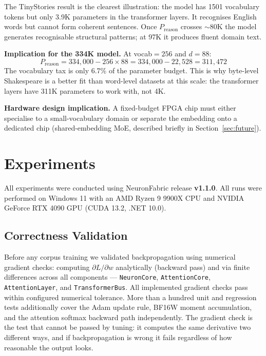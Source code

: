 \documentclass[11pt]{article}
\newcommand{\repoversion}{v1.1.0}
\begin{document}
The TinyStories result is the clearest illustration: the model has 1501 vocabulary
tokens but only 3.9K parameters in the transformer layers. It recognises English
words but cannot form coherent sentences. Once $P_{\text{reason}}$ crosses $\sim$80K
the model generates recognisable structural patterns; at 97K it produces fluent
domain text.

\textbf{Implication for the 334K model.} At vocab$=256$ and $d{=}88$:
\[
P_{\text{reason}} = 334{,}000 - 256 \times 88 = 334{,}000 - 22{,}528 = 311{,}472
\]
The vocabulary tax is only 6.7\% of the parameter budget. This is why byte-level
Shakespeare is a better fit than word-level datasets at this scale: the transformer
layers have 311K parameters to work with, not 4K.

\textbf{Hardware design implication.} A fixed-budget FPGA chip must either
specialise to a small-vocabulary domain or separate the embedding onto a dedicated
chip (shared-embedding MoE, described briefly in Section~\ref{sec:future}).

\section{Experiments}

\label{sec:experiments}

All experiments were conducted using NeuronFabric release \textbf{\repoversion}.
All runs were performed on Windows 11 with an AMD Ryzen 9 9900X CPU and NVIDIA GeForce RTX 4090 GPU (CUDA 13.2, .NET 10.0).

\subsection{Correctness Validation}

Before any corpus training we validated backpropagation using numerical gradient
checks: computing $\partial L / \partial w$ analytically (backward pass) and via
finite differences across all components --- \texttt{NeuronCore},
\texttt{AttentionCore}, \texttt{AttentionLayer}, and \texttt{TransformerBus}.
All implemented gradient checks pass within configured numerical tolerance. More than a hundred unit and regression tests additionally cover the Adam update rule, BF16W moment
accumulation, and the attention softmax backward path independently.
The gradient check is the test that cannot be passed by tuning: it computes the
same derivative two different ways, and if backpropagation is wrong it fails
regardless of how reasonable the output looks.
\end{document}
